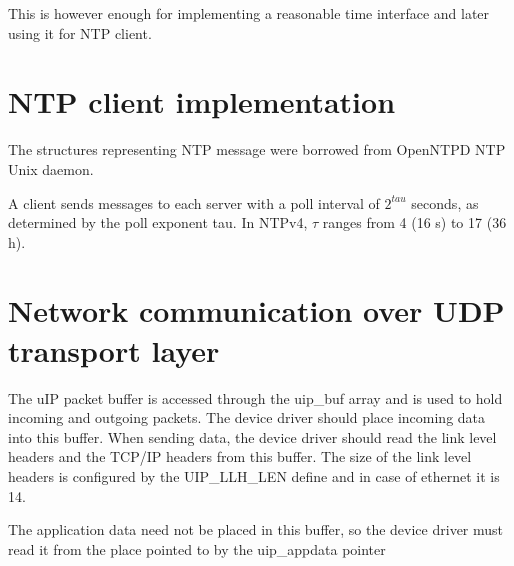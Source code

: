 
This is however enough for implementing a reasonable time interface and later using it for NTP client.




\section{NTP client implementation}
The structures representing NTP message were borrowed from OpenNTPD NTP Unix daemon.

A client sends messages to each server with a poll interval of $2^{tau}$
seconds, as determined by the poll exponent tau.
In NTPv4, $\tau$ ranges from 4 (16 s) to 17 (36 h).


\section{Network communication over UDP transport layer}
The uIP packet buffer is accessed through
the uip\_buf array and is used to hold incoming and outgoing packets.
The device driver should place incoming data into this buffer.
When sending data, the device driver should read the link
level headers and the TCP/IP headers from this buffer.
The size of the link level headers is configured by the UIP\_LLH\_LEN
define and in case of ethernet it is 14.

The application data need not be placed in this buffer, so
the device driver must read it from the place pointed to by the
uip\_appdata pointer %
